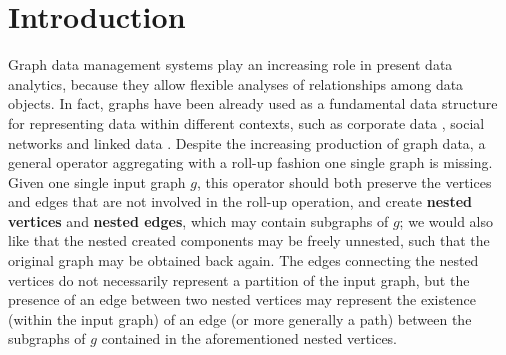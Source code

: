 \section{Introduction}
Graph data management systems play an increasing role in present data analytics, because they allow flexible analyses of relationships among data objects. In fact, graphs have been already used as a fundamental data structure for representing data within different contexts, such as corporate data \cite{success,Park2016355}, social networks \cite{xie,BrodkaK14}  and linked data \cite{Vasilyeva13}. Despite the increasing production of graph data, a general operator aggregating with a roll-up fashion one single graph is missing. Given one single input graph $g$, this operator should both preserve the vertices and edges that are not involved in the roll-up operation, and create \textbf{nested vertices} and \textbf{nested edges}, which may contain subgraphs of $g$; we would also like that the nested created components may be freely unnested, such that the original graph may be obtained back again. The edges connecting the nested vertices do not necessarily represent a partition of the input graph, but the presence of an edge between two nested vertices may represent the existence (within the input graph) of an edge (or more generally a path) between the subgraphs of $g$ contained in the aforementioned nested vertices.%

